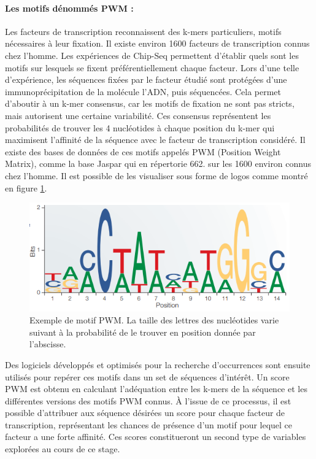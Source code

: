 \documentclass[french]{llncs}
\begin{document}
\paragraph{Les motifs dénommés PWM : }

Les facteurs de transcription reconnaissent des k-mers particuliers, motifs nécessaires à leur fixation. Il existe environ 1600 facteurs de transcription connus chez l'homme. Les expériences de Chip-Seq permettent d'établir quels sont les motifs sur lesquels se fixent préférentiellement chaque facteur. Lors d'une telle d'expérience, les séquences fixées par le facteur étudié sont protégées d'une immunoprécipitation de la molécule l'ADN, puis séquencées. Cela permet d'aboutir à un k-mer consensus, car les motifs de fixation ne sont pas stricts, mais autorisent une certaine variabilité. Ces consensus représentent les probabilités de trouver les 4 nucléotides à chaque position du k-mer qui maximisent l'affinité de la séquence avec le facteur de transcription considéré.
Il existe des bases de données de ces motifs appelés PWM (Position Weight Matrix), comme la base Jaspar \cite{sandelin_jaspar:_2004} qui en répertorie 662. sur les 1600 environ connus chez l'homme. Il est possible de les visualiser sous forme de logos comme montré en figure \ref{fig/logo_pwm}.

\begin{figure}[h]
\begin{center}
 	\includegraphics[width=0.6\linewidth]{Images/LOGO.PNG}
 \caption{Exemple de motif PWM. La taille des lettres des nucléotides varie suivant à la probabilité de le trouver en position donnée par l'abscisse. } \label{fig/logo_pwm}
\end{center}
\end{figure}

Des logiciels développés et optimisés pour la recherche d'occurrences sont ensuite utilisés pour repérer ces motifs dans un set de séquences d'intérêt. Un score PWM est obtenu en calculant l'adéquation entre les k-mers de la séquence et les différentes versions des motifs PWM connus. À l'issue de ce processus, il est possible d'attribuer aux séquence désirées un score pour chaque facteur de transcription, représentant les chances de présence d'un motif pour lequel ce facteur a une forte affinité. Ces scores constitueront un second type de variables explorées au cours de ce stage.
\end{document}

